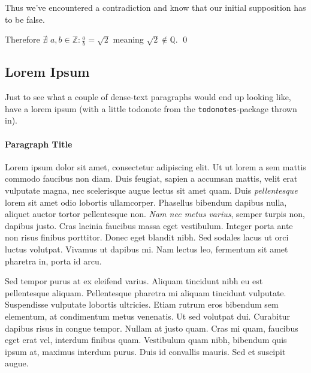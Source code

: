 \documentclass{article}
\begin{document}
    Thus we've encountered a contradiction and know that our initial supposition has to 
    be false. 

    Therefore 
        $\nexists \,\, a,b\in\mathbb{Z} : \frac{a}{b} = \sqrt{2}$
    meaning $\sqrt{2} \not\in \mathbb{Q}$. 
    \qed

    \subsection{Lorem Ipsum}
	Just to see what a couple of dense-text paragraphs would end up looking like, have a 
    lorem ipsum (with a little todonote from the \texttt{todonotes}-package thrown in). 
	
	\paragraph{Paragraph Title}
	Lorem ipsum dolor sit amet, consectetur adipiscing elit. Ut ut lorem a sem mattis 
	commodo faucibus non diam. Duis feugiat, sapien a accumsan mattis, velit erat 
    vulputate magna, nec scelerisque augue lectus sit amet quam. 
    Duis \textit{pellentesque} lorem sit amet odio lobortis ullamcorper. 
    Phasellus bibendum dapibus nulla, aliquet auctor tortor pellentesque non. 
    \textit{Nam nec metus varius}, semper turpis non, dapibus 
    justo. Cras lacinia faucibus massa eget vestibulum. Integer porta ante non risus 
    finibus porttitor. Donec eget blandit nibh. Sed sodales lacus ut orci luctus 
    volutpat. Vivamus ut dapibus mi. Nam lectus leo, fermentum sit amet pharetra in, 
    porta id arcu.

	Sed tempor purus at ex eleifend varius. Aliquam tincidunt nibh eu est pellentesque 
    aliquam. Pellentesque pharetra mi aliquam tincidunt vulputate. Suspendisse vulputate 
    lobortis ultricies. Etiam rutrum eros bibendum sem elementum, at condimentum metus 
    venenatis. Ut sed volutpat dui. Curabitur dapibus risus in congue tempor. Nullam 
    at justo quam. Cras mi quam, faucibus eget erat vel, interdum finibus 
    quam. Vestibulum quam nibh, bibendum quis ipsum at, maximus interdum 
    purus. Duis id convallis mauris. Sed et suscipit augue.
\end{document}
